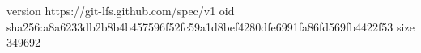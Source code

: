 version https://git-lfs.github.com/spec/v1
oid sha256:a8a6233db2b8b4b457596f52fc59a1d8bef4280dfe6991fa86fd569fb4422f53
size 349692
